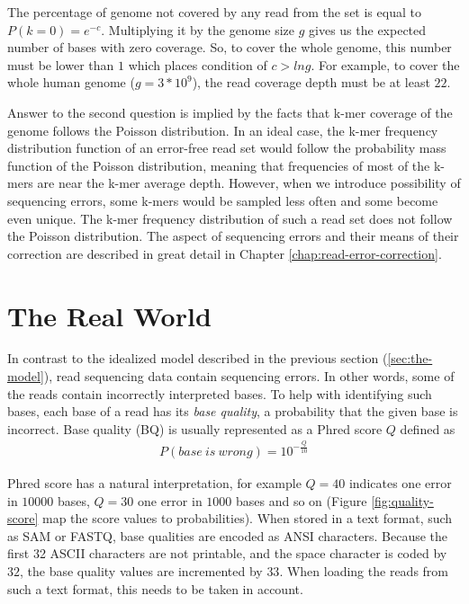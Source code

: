 The percentage of genome not covered by any read from the set is equal to $P(k=0) = e^{-c}$. Multiplying it by the genome size $g$ gives us the expected number of bases with zero coverage. So, to cover the whole genome, this number must be lower than $1$ which places condition of $c > ln g$. For example, to cover the whole human genome ($g = 3 * 10^9$), the read coverage depth must be at least $22$.  

Answer to the second question is implied by the facts that k-mer coverage of the genome follows the Poisson distribution. In an ideal case, the k-mer frequency distribution function of an error-free read set would follow the probability mass function of the Poisson distribution, meaning that frequencies of most of the k-mers are near the k-mer average depth. However, when we introduce possibility of sequencing errors, some k-mers would be sampled less often and some become even unique. The k-mer frequency distribution of such a read set does not follow the Poisson distribution. The aspect of sequencing errors and their means of their correction are described in great detail in Chapter \ref{chap:read-error-correction}. 

\section{The Real World} 
\label{sec:real-world} 

In contrast to the idealized model described in the previous section (\ref{sec:the-model}), read sequencing data contain sequencing errors. In other words, some of the reads contain incorrectly interpreted bases. To help with identifying such bases, each base of a read has its \textit{base quality}, a probability that the given base is incorrect. Base quality (BQ) is usually represented as a Phred score $Q$ defined as 
\begin{align*} 
P(base \: is \: wrong) = 10^{-\frac{Q}{10}} 
\end{align*} 

Phred score has a natural interpretation, for example $Q=40$ indicates one error in $10000$ bases, $Q=30$ one error in $1000$ bases and so on (Figure \ref{fig:quality-score} map the score values to probabilities). When stored in a text format, such as SAM or FASTQ, base qualities are encoded as ANSI characters. Because the first 32 ASCII characters are not printable, and the space character is coded by $32$, the base quality values are incremented by $33$. When loading the reads from such a text format, this needs to be taken in account. 

